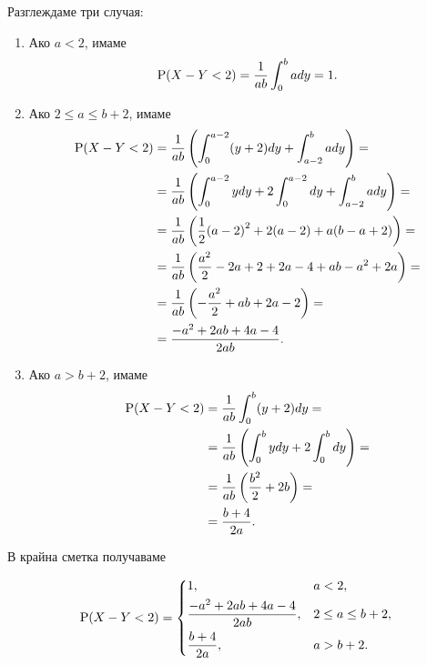 \documentclass[numbers=endperiod, bibliography=totocnumbered]{scrartcl}
\begin{document}
\begin{solution}
\begin{enumerate}[label=\alph*)]
    Разглеждаме три случая:
    \begin{enumerate}[label=\arabic*)]
      \item Ако \( a < 2 \), имаме
      \begin{align*}
        \operatorname{P}(X - Y < 2)
        =
        \frac 1 {ab} \int_0^b a dy
        =
        1.
      \end{align*}

      \item Ако \( 2 \leq a \leq b + 2 \), имаме
      \begin{align*}
        \operatorname{P}(X - Y < 2)
        &=
        \frac 1 {ab} \left(\int_0^{a-2} (y+2) dy + \int_{a-2}^b a dy \right)
        = \\ &=
        \frac 1 {ab} \left(\int_0^{a-2} y dy + 2 \int_0^{a-2} dy + \int_{a-2}^b a dy \right)
        = \\ &=
        \frac 1 {ab} \left(\frac 1 2 {(a-2)}^2 + 2(a-2) + a(b-a+2) \right)
        = \\ &=
        \frac 1 {ab} \left(\frac {a^2} 2 - 2a + 2 + 2a - 4 + ab - a^2 + 2a \right)
        = \\ &=
        \frac 1 {ab} \left(-\frac {a^2} 2 + ab + 2a - 2 \right)
        = \\ &=
        \frac {-a^2 + 2ab + 4a - 4} {2ab}.
      \end{align*}

      \item Ако \( a > b + 2 \), имаме
      \begin{align*}
        \operatorname{P}(X - Y < 2)
        &=
        \frac 1 {ab} \int_0^b (y+2) dy
        = \\ &=
        \frac 1 {ab} \left( \int_0^b y dy + 2 \int_0^b dy \right)
        = \\ &=
        \frac 1 {ab} \left(\frac {b^2} 2 + 2b \right)
        = \\ &=
        \frac {b + 4} {2a}.
      \end{align*}
    \end{enumerate}

    В крайна сметка получаваме

    \begin{align*}
      \operatorname{P}(X - Y < 2) = \begin{dcases}
        1, &a < 2, \\
        \frac {-a^2 + 2ab + 4a - 4} {2ab}, &2 \leq a \leq b + 2, \\
        \frac {b + 4} {2a}, &a > b + 2.
      \end{dcases}
    \end{align*}
  \end{enumerate}
\end{solution}

\printbibliography
\end{document}
